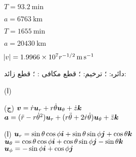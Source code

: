 \begin {description}\setlength {\parskip }{0pt} \setlength {\itemsep }{0pt plus 1pt}
\item [
1)
]
 $T=\SI {93.2}{\minute }$ 
\item [
3)
]
 $a=\SI {6763}{\kilo \meter }$ 
\item [
5)
]
 $T=\SI {1655}{\minute }$ 
\item [
7)
]
 $a=\SI {20430}{\kilo \meter }$ 
\item [
9)
]
 $\abs {v}=1.9966\times 10^7r^{-1/2}\,\si {\meter \per \second }$ 
\item [
11)
]
 دائرہ: ؛ ترخیم: ؛ قطع مکافی : ؛ قطع زائد:  
\item [
15)
]
 (ا) \\  
\item [
17)
]
 (ج) ${{\boldsymbol{v}}}=\dot {r}{{\boldsymbol{u}}}_r+r\dot {\theta }{{\boldsymbol{u}}}_{\theta }+\dot {z}{\boldsymbol{k}} $\\ ${{\boldsymbol{a}}}=(\ddot {r}-r\dot {\theta }^2){{\boldsymbol{u}}}_r+(r\ddot {\theta }+2\dot {r}\dot {\theta }){{\boldsymbol{u}}}_{\theta }+\ddot {z}{\boldsymbol{k}} $ 
\item [
19)
]
 (ا) ${{\boldsymbol{u}}}_r=\sin \theta \cos \phi {\boldsymbol{i}} +\sin \theta \sin \phi {\boldsymbol{j}} +\cos \theta {\boldsymbol{k}} $\\ ${{\boldsymbol{u}}}_{\theta }=\cos \theta \cos \phi {\boldsymbol{i}} +\cos \theta \sin \phi {\boldsymbol{j}} -\sin \theta {\boldsymbol{k}} $\\ ${{\boldsymbol{u}}}_{\phi }=-\sin \phi {\boldsymbol{i}} +\cos \phi {\boldsymbol{j}} $ 
\end {description}
